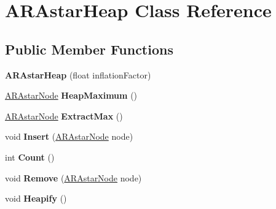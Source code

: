 \hypertarget{class_a_r_astar_heap}{\section{A\-R\-Astar\-Heap Class Reference}
\label{class_a_r_astar_heap}
}
\subsection*{Public Member Functions}
\begin{DoxyCompactItemize}
\item 
\hypertarget{class_a_r_astar_heap_a699bf0a23b37f6f30ff2c04d2d445740}{{\bfseries A\-R\-Astar\-Heap} (float inflation\-Factor)}\label{class_a_r_astar_heap_a699bf0a23b37f6f30ff2c04d2d445740}

\item 
\hypertarget{class_a_r_astar_heap_aeb5fa05fb217b9650d2cd62b105b9a25}{\hyperlink{class_a_r_astar_node}{A\-R\-Astar\-Node} {\bfseries Heap\-Maximum} ()}\label{class_a_r_astar_heap_aeb5fa05fb217b9650d2cd62b105b9a25}

\item 
\hypertarget{class_a_r_astar_heap_a535db2f13d9af1e23757671601ad0f70}{\hyperlink{class_a_r_astar_node}{A\-R\-Astar\-Node} {\bfseries Extract\-Max} ()}\label{class_a_r_astar_heap_a535db2f13d9af1e23757671601ad0f70}

\item 
\hypertarget{class_a_r_astar_heap_a3ec8e0df935cb41937a202061caac700}{void {\bfseries Insert} (\hyperlink{class_a_r_astar_node}{A\-R\-Astar\-Node} node)}\label{class_a_r_astar_heap_a3ec8e0df935cb41937a202061caac700}

\item 
\hypertarget{class_a_r_astar_heap_a9ee6d644c983c0155159ee5ffa4d2801}{int {\bfseries Count} ()}\label{class_a_r_astar_heap_a9ee6d644c983c0155159ee5ffa4d2801}

\item 
\hypertarget{class_a_r_astar_heap_aae69fc99cd7df772bbfcfb6f3431c2ae}{void {\bfseries Remove} (\hyperlink{class_a_r_astar_node}{A\-R\-Astar\-Node} node)}\label{class_a_r_astar_heap_aae69fc99cd7df772bbfcfb6f3431c2ae}

\item 
\hypertarget{class_a_r_astar_heap_a700bc67c2fb4973bc75e3e9ad0fc4bca}{void {\bfseries Heapify} ()}\label{class_a_r_astar_heap_a700bc67c2fb4973bc75e3e9ad0fc4bca}

\end{DoxyCompactItemize}
